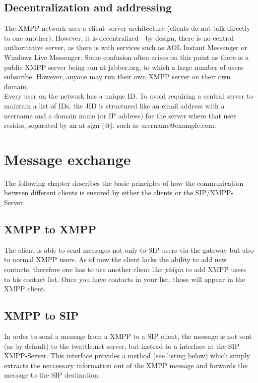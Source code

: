 \documentclass{article}
\begin{document}
\subsection{Decentralization and addressing}

The XMPP network uses a client–server architecture (clients do not talk directly to one another). However, it is decentralized—by design, there is no central authoritative server, as there is with services such as AOL Instant Messenger or Windows Live Messenger. Some confusion often arises on this point as there is a public XMPP server being run at jabber.org, to which a large number of users subscribe. However, anyone may run their own XMPP server on their own domain. \\

\noindent
Every user on the network has a unique ID. To avoid requiring a central server to maintain a list of IDs, the JID is structured like an email address with a username and a domain name (or IP address) for the server where that user resides, separated by an at sign (@), such as username@example.com.

\newpage

\section{Message exchange}

The following chapter describes the basic principles of how the communication between different clients is ensured by either the clients or the SIP/XMPP-Server.

\subsection{XMPP to XMPP}
The client is able to send messages not only to SIP users via the gateway but also to normal XMPP users. As of now the client lacks the ability to add new contacts, therefore one has to use another client like \emph{pidgin} to add XMPP users to his contact list. Once you have contacts in your list, those will appear in the XMPP client.

\subsection{XMPP to SIP}

In order to send a message from a XMPP to a SIP client, the message is not sent (as by default) to the twattle.net server, but instead to a interface at the SIP-XMPP-Server. This interface provides a method (see listing below) which simply extracts the neccessary information out of the XMPP message and forwards the message to the SIP destination.
\end{document}
